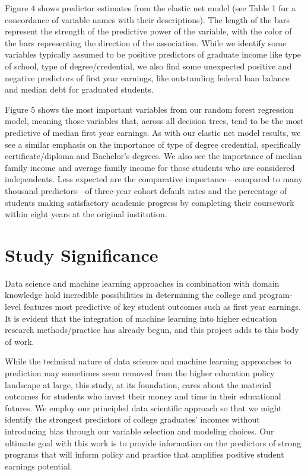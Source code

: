 \documentclass[a4paper, 12pt]{article}
\begin{document}
Figure 4 shows predictor estimates from the elastic net model (see Table 1 for a concordance of variable names with their descriptions). The length of the bars represent the strength of the predictive power of the variable, with the color of the bars representing the direction of the association. While we identify some variables typically assumed to be positive predictors of graduate income like type of school, type of degree/credential, we also find some unexpected positive and negative predictors of first year earnings, like outstanding federal loan balance and median debt for graduated students.

Figure 5 shows the most important variables from our random forest regression model, meaning those variables that, across all decision trees, tend to be the most predictive of median first year earnings. As with our elastic net model results, we see a similar emphasis on the importance of type of degree credential, specifically certificate/diploma and Bachelor's degrees. We also see the importance of median family income and average family income for those students who are considered independents. Less expected are the comparative importance---compared to many thousand predictors---of three-year cohort default rates and the percentage of students making satisfactory academic progress by completing their coursework within eight years at the original institution.

\section*{Study Significance}

Data science and machine learning approaches in combination with domain knowledge hold incredible possibilities in determining the college and program-level features most predictive of key student outcomes such as first year earnings. It is evident that the integration of machine learning into higher education research methods/practice has already begun, and this project adds to this 
body of work.

While the technical nature of data science and machine learning approaches to prediction may sometimes seem removed from the higher education policy landscape at large, this study, at its foundation, cares about the material outcomes for students who invest their money and time in their educational futures. We employ our principled data scientific approach so that we might identify the strongest predictors of college graduates' incomes without introducing bias through our variable selection and modeling choices. Our ultimate goal with this work is to provide information on the predictors of strong programs that will inform policy and practice that amplifies positive student earnings potential.

\pagebreak
\printbibliography
\end{document}
